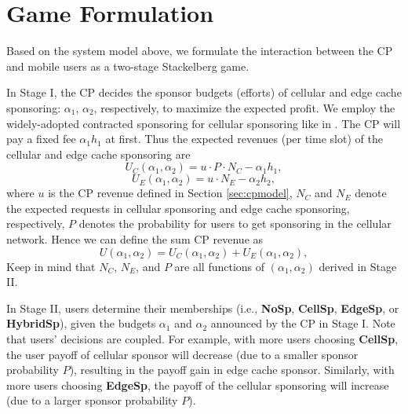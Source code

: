 \iffalse
To avoid trivial scenarios, we further assume:
\begin{itemize}
\item $v-c_1>\phi$: that is, users can always benefit from per sponsored request. Also, the payoff a user achieves from per sponsored video is larger than the time average energy cost. This is important for encouraging users to join sponsoring plans. If this is violated, then there will be no data sponsor.
\end{itemize}
\fi

\section{Game Formulation}

Based on the system model above, we formulate the interaction between the CP and mobile users as a two-stage Stackelberg game.

In Stage I, the CP decides the sponsor budgets (efforts) of cellular and edge cache sponsoring: $\alpha_1$, $\alpha_2$, respectively, to maximize the expected profit. We employ the widely-adopted contracted sponsoring for cellular sponsoring like in \cite{pricing}. The CP will pay a fixed fee $\alpha_1 h_1$ at first. Thus the expected revenues (per time slot) of the cellular and edge cache sponsoring are
\begin{equation}U_C(\alpha_1, \alpha_2)=u\cdot P\cdot N_C  - \alpha_1 h_1,\end{equation}
\begin{equation}U_E(\alpha_1, \alpha_2)= u\cdot N_E - \alpha_2 h_2,\end{equation}
where $u$ is the CP revenue defined in Section \ref{sec:cpmodel}, $N_C$ and $N_E$ denote the expected requests in cellular sponsoring and edge cache sponsoring, respectively, $P$  denotes the probability for users to get sponsoring in the cellular network. Hence we can define the sum CP revenue as
\begin{equation}U(\alpha_1, \alpha_2)=U_C(\alpha_1, \alpha_2)+U_E(\alpha_1, \alpha_2),\end{equation}
Keep in mind that $N_C$, $N_E$, and $P$ are all functions of $(\alpha_1, \alpha_2)$ derived in Stage II.

In Stage II, users determine their memberships (i.e., \textbf{NoSp}, \textbf{CellSp}, \textbf{EdgeSp}, or \textbf{HybridSp}), given the budgets $\alpha_1$ and $\alpha_2$ announced by the CP in Stage I. Note that users' decisions are coupled. For example, with more users choosing \textbf{CellSp}, the user payoff of cellular sponsor will decrease (due to a smaller sponsor probability $P$), resulting in the payoff gain in edge cache sponsor. Similarly, with more users choosing \textbf{EdgeSp}, the payoff of the cellular sponsoring will increase (due to a larger sponsor probability $P$).

